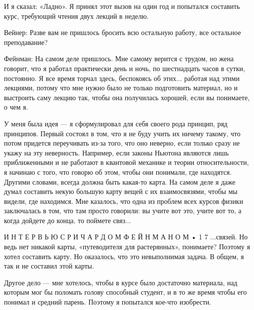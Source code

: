 \documentclass[11pt,oneside]{article}
\begin{document}
И я сказал: «Ладно». Я принял этот вызов на один год и попытался составить курс, требующий чтения двух лекций в неделю.\par



Вейнер: Разве вам не пришлось бросить всю остальную работу, все остальное преподавание?\par



Фейнман: На самом деле пришлось. Мне самому верится с трудом, но жена говорит, что я работал практически день и ночь, по шестнадцать часов в сутки, постоянно. Я все время торчал здесь, беспокоясь об этих... работая над этими лекциями, потому что мне нужно было не только подготовить материал, но и выстроить саму лекцию так, чтобы она получилась хорошей, если вы понимаете, о чем я.\par



У меня была идея --- я сформулировал для себя своего рода принцип, ряд принципов. Первый состоял в том, что я не буду учить их ничему такому, что потом придется переучивать из-за того, что оно неверно, если только сразу не укажу на эту неверность. Например, если законы Ньютона являются лишь приближенными и не работают в квантовой механике и теории относительности, я начинаю с того, что говорю об этом, чтобы они понимали, где находятся. Другими словами, всегда должна быть какая-то карта. На самом деле я даже думал составить некую большую карту вещей с их взаимосвязями, чтобы мы видели, где находимся. Мне казалось, что одна из проблем всех курсов физики заключалась в том, что там просто говорили: вы учите вот это, учите вот то, а когда дойдете до конца, то поймете связ...\par



И Н Т Е Р В Ь Ю  С  Р И Ч А Р Д О М  Ф Е Й Н М А Н О М • 1 7 ...связей. Но ведь нет никакой карты, «путеводителя для растерянных», понимаете? Поэтому я хотел составить карту. Но оказалось, что это невыполнимая задача. В общем, я так и не составил этой карты.\par



Другое дело --- мне хотелось, чтобы в курсе было достаточно материала, над которым мог бы поломать голову способный студент, и в то же время чтобы его понимал и средний парень. Поэтому я попытался кое-что изобрести.\par
\end{document}
